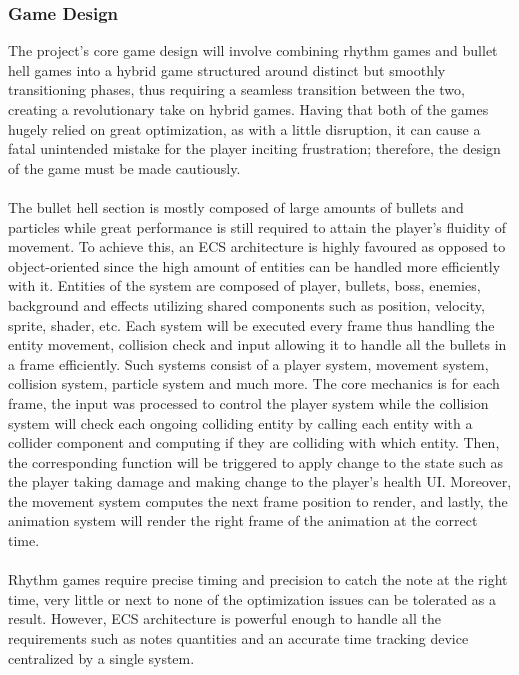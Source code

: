 \subsubsection*{Game Design}

The project’s core game design will involve combining rhythm games and bullet hell games into a hybrid game
structured around distinct but smoothly transitioning phases,
thus requiring a seamless transition between the two, creating a revolutionary take on hybrid games.
Having that both of the games hugely relied on great optimization, as with a little disruption,
it can cause a fatal unintended mistake for the player inciting frustration;
therefore, the design of the game must be made cautiously.
\\\\
The bullet hell section is mostly composed of large amounts of bullets and particles
while great performance is still required to attain the player’s fluidity of movement.
To achieve this, an ECS architecture is highly favoured as opposed to object-oriented
since the high amount of entities can be handled more efficiently with it.
Entities of the system are composed of player, bullets, boss, enemies, background and effects
utilizing shared components such as position, velocity, sprite, shader, etc.
Each system will be executed every frame thus handling the entity movement,
collision check and input allowing it to handle all the bullets in a frame efficiently.
Such systems consist of a player system, movement system, collision system, particle system and much more.
The core mechanics is for each frame, the input was processed to control the player system
while the collision system will check each ongoing colliding entity by calling each entity with a collider component
and computing if they are colliding with which entity.
Then, the corresponding function will be triggered to apply change to the state such as the player taking damage and making change to the player’s health UI\@.
Moreover, the movement system computes the next frame position to render, and lastly, the animation system will render the right frame of the animation at the correct time.
\\\\
Rhythm games require precise timing and precision to catch the note at the right time,
very little or next to none of the optimization issues can be tolerated as a result.
However, ECS architecture is powerful enough to handle all the requirements
such as notes quantities and an accurate time tracking device centralized by a single system.
